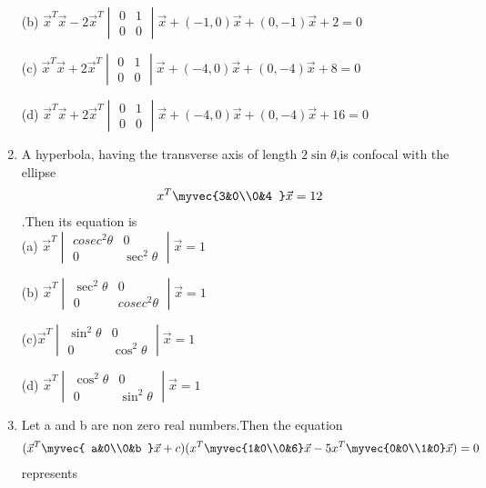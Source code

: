 \begin{enumerate}
     \choice (b) $\vec x^T\vec x-2\vec x^T\begin{vmatrix} 0&1\\0&0 \end{vmatrix} \vec x+(-1,0)\vec x+(0,-1)\vec x+2=0$
     
      \choice (c) $\vec x^T\vec x+2\vec x^T\begin{vmatrix} 0&1\\0&0 \end{vmatrix} \vec x+(-4,0)\vec x+(0,-4)\vec x+8=0$
      
      \choice (d) $\vec x^T\vec x+2\vec x^T\begin{vmatrix} 0&1\\0&0 \end{vmatrix} \vec x+(-4,0)\vec x+(0,-4)\vec x+16=0$\\
      
      \item A hyperbola, having the transverse axis of length $2\sin\theta$,is confocal with the ellipse \begin{align} x^T\myvec {3&0\\0&4 }\vec x=12\end{align}.Then its equation is \\
      
      \choice (a) $\vec x^T\begin{vmatrix} cosec^2 \theta&0\\0&\sec^2\theta \end{vmatrix} \vec x =1$
      
      \choice (b) $\vec x^T\begin{vmatrix} \sec^2\theta&0\\0& cosec^2\theta \end{vmatrix} \vec x=1$
     
      
      \choice (c)$\vec x^T\begin{vmatrix} \sin^2\theta&0\\0&\cos^2\theta \end{vmatrix} \vec x=1$
      
      \choice (d) $\vec x^T\begin{vmatrix} \cos^2\theta&0\\0&\sin^2\theta \end{vmatrix} \vec x=1$\\
      
      \item Let a and b are non zero real numbers.Then the equation \begin{align}(\vec x^T\myvec{ a&0\\0&b }\vec x+c)( x^T\myvec {1&0\\0&6} \vec x-5x^T\myvec{0&0\\1&0} \vec x)=0\end{align}represents\\
      

\end{enumerate}
